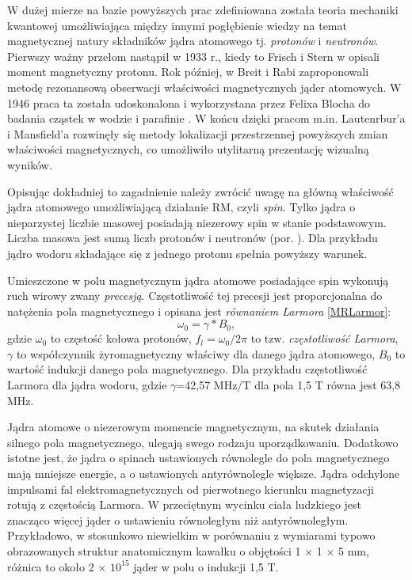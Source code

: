 W dużej mierze na bazie powyższych prac zdefiniowana została teoria mechaniki kwantowej umożliwiająca między innymi pogłębienie wiedzy na temat magnetycznej natury składników jądra atomowego tj. \textit{protonów} i \textit{neutronów}. Pierwszy ważny przełom nastąpił w 1933 r., kiedy to Frisch i Stern w \cite{Frisch1933} opisali moment magnetyczny protonu. Rok później, w \cite{Breit1934} Breit i Rabi zaproponowali metodę rezonansową obserwacji właściwości magnetycznych jąder atomowych. W 1946 praca ta została udoskonalona i wykorzystana przez Felixa Blocha do badania cząstek w wodzie \linebreak i parafinie \cite{Bloch1946}. W końcu dzięki pracom m.in. Lautenrbur'a \cite{LAUTERBUR1973} i Mansfield'a \cite{Mansfield1977} rozwinęły się metody lokalizacji przestrzennej powyższych zmian właściwości magnetycznych, co umożliwiło utylitarną prezentację wizualną wyników. 

Opisując dokładniej to zagadnienie należy zwrócić uwagę na główną właściwość jądra atomowego umożliwiającą działanie RM, czyli \textit{spin}. Tylko jądra o nieparzystej liczbie masowej posiadają niezerowy spin w stanie podstawowym. Liczba masowa jest sumą liczb protonów i neutronów (por. \cite{RM2015}). Dla przykładu jądro wodoru składające się z jednego protonu spełnia powyższy warunek. 

Umieszczone w polu magnetycznym jądra atomowe posiadające spin wykonują ruch wirowy zwany \textit{precesją}. Częstotliwość tej precesji jest proporcjonalna do natężenia pola magnetycznego i opisana jest \textit{równaniem Larmora} \ref{MRLarmor}:
\begin{equation}
\label{MRLarmor}
\omega_0 = \gamma \ast B_0,
\end{equation}
gdzie $\omega_0$ to częstość kołowa protonów, $f_l = \omega_0/2\pi$ to tzw. \textit{częstotliwość Larmora}, $\gamma$ to współczynnik żyromagnetyczny właściwy dla danego jądra atomowego, $B_0$ \linebreak to wartość indukcji danego pola magnetycznego. Dla przykładu częstotliwość Larmora dla jądra wodoru, gdzie $\gamma$=42,57 MHz/T dla pola 1,5 T równa jest 63,8 MHz. 

Jądra atomowe o niezerowym momencie magnetycznym, na skutek działania silnego pola magnetycznego, ulegają swego rodzaju uporządkowaniu. Dodatkowo istotne jest, że jądra o spinach ustawionych równolegle do pola magnetycznego mają mniejsze energie, a o ustawionych antyrównolegle większe. Jądra odchylone impulsami fal elektromagnetycznych od pierwotnego kierunku magnetyzacji rotują \linebreak z częstością Larmora. W przeciętnym wycinku ciała ludzkiego jest znacząco więcej jąder o ustawieniu równoległym niż antyrównoległym. Przykładowo, w stosunkowo niewielkim w porównaniu z wymiarami typowo obrazowanych struktur anatomicznym kawałku o objętości 1 $\times$ 1 $\times$ 5 mm, różnica to około 2 $\times$ $10^{15}$ jąder w polu \linebreak o indukcji 1,5 T. 

